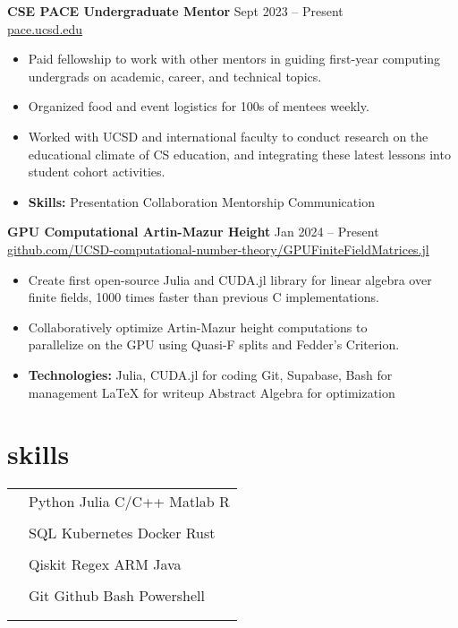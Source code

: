\documentclass[11pt]{article}
\newcommand{\entry}[3]{{{\textbf{#1}}} \hfill #2 \\ #3 \hfill \hspace{0em}}
\newcommand{\tableentry}[3]{\textsc{#1} & #2\expandafter\ifstrequal\expandafter{#3}{}{\\}{\\[6pt]}}
\renewcommand{\>}{\textperiodcentered{}}
\begin{document}
\begin{paracol}{2}
\entry{CSE PACE Undergraduate Mentor}{Sept 2023 -- Present}
{\href{https://pace.ucsd.edu/}{\footnotesize pace.ucsd.edu \normalsize}}
\begin{itemize}[noitemsep,leftmargin=3.5mm,rightmargin=0mm,topsep=3pt]
    \item Paid fellowship to work with other mentors in guiding first-year computing undergrads on academic, career, and technical topics.
    \item Organized food and event logistics for 100s of mentees weekly.
    \item Worked with UCSD and international faculty to conduct research on the educational climate of CS education, and integrating these latest lessons into student cohort activities.
    \item \textbf{Skills:} Presentation \> Collaboration \> Mentorship \> Communication
\end{itemize}
\medskip

\entry{GPU Computational Artin-Mazur Height}{Jan 2024 -- Present}
{\href{https://github.com/UCSD-computational-number-theory/GPUFiniteFieldMatrices.jl}{\footnotesize github.com/UCSD-computational-number-theory/GPUFiniteFieldMatrices.jl \normalsize}}
\begin{itemize}[noitemsep,leftmargin=3.5mm,rightmargin=0mm,topsep=3pt]
    \item Create first open-source Julia and CUDA.jl library for linear algebra over finite fields, 1000 times faster than previous C implementations.
    \item Collaboratively optimize Artin-Mazur height computations to \\ parallelize on the GPU using Quasi-F splits and Fedder's Criterion.
    \item \textbf{Technologies:} Julia, CUDA.jl for coding \> Git, Supabase, Bash for management \> LaTeX for writeup \> Abstract Algebra for optimization
\end{itemize}
\medskip

\switchcolumn

\section{skills}
\begin{supertabular}{rl}

\tableentry{\footnotesize\faCode}
{Python \> Julia \> C/C++ \> Matlab \> R}{}
\tableentry{}{SQL \> Kubernetes \> Docker \> Rust}{}
\tableentry{}{Qiskit \> Regex \> ARM \> Java}{}
\vspace{0.5em}
\tableentry{}{Git \> Github \> Bash \> Powershell}{}


\end{supertabular}
\end{paracol}
\end{document}
